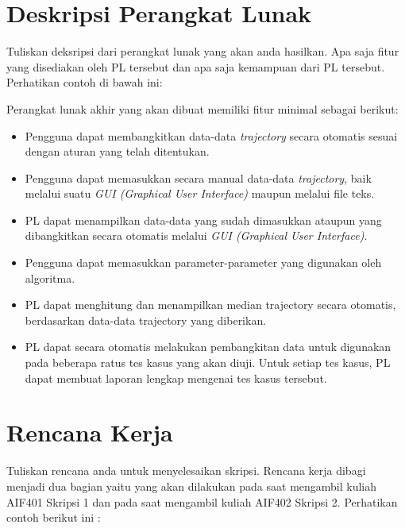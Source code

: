 \documentclass[a4paper,twoside]{article}
\begin{document}
\section{Deskripsi Perangkat Lunak}
Tuliskan deksripsi dari perangkat lunak yang akan anda hasilkan. Apa saja fitur yang disediakan oleh PL tersebut dan apa saja kemampuan dari PL tersebut. Perhatikan contoh di bawah ini:

Perangkat lunak akhir yang akan dibuat memiliki fitur minimal sebagai berikut:
\begin{itemize}
	\item Pengguna dapat membangkitkan data-data {\it trajectory} secara otomatis sesuai dengan aturan yang telah ditentukan.
	\item Pengguna dapat memasukkan secara manual data-data {\it trajectory}, baik melalui suatu {\it GUI (Graphical User Interface)} maupun melalui file teks. 
	\item PL dapat menampilkan data-data yang sudah dimasukkan ataupun yang dibangkitkan secara otomatis melalui {\it GUI (Graphical User Interface)}.
	\item Pengguna dapat memasukkan parameter-parameter yang digunakan oleh algoritma.
	\item PL dapat menghitung dan menampilkan median trajectory secara otomatis, berdasarkan data-data trajectory yang diberikan.
	\item PL dapat secara otomatis melakukan pembangkitan data untuk digunakan pada beberapa ratus tes kasus yang akan diuji. Untuk setiap tes kasus, PL dapat membuat laporan lengkap mengenai tes kasus tersebut.
\end{itemize}

\section{Rencana Kerja}
Tuliskan rencana anda untuk menyelesaikan skripsi. Rencana kerja dibagi menjadi dua bagian yaitu yang akan dilakukan pada saat mengambil kuliah AIF401 Skripsi 1 dan pada saat mengambil kuliah AIF402 Skripsi 2. Perhatikan contoh berikut ini :
\end{document}
